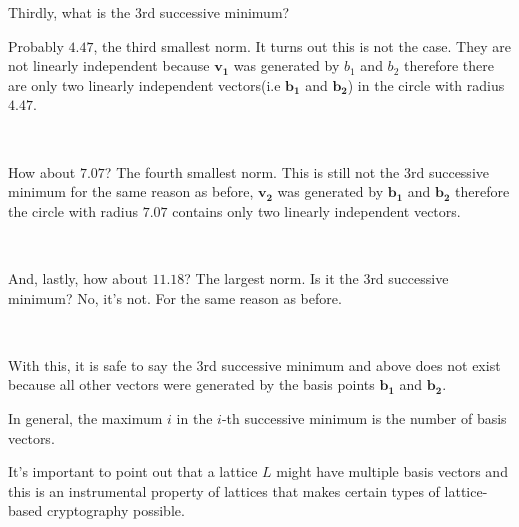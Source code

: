 \documentclass[11pt]{article}
\begin{document}
    Thirdly, what is the 3rd successive minimum?

Probably \(4.47\), the third smallest norm. It turns out this is not the
case. They are not linearly independent because \(\mathbf{v_1}\) was
generated by \(b_1\) and \(b_2\) therefore there are only two linearly
independent vectors(i.e \(\mathbf{b_1}\) and \(\mathbf{b_2}\)) in the
circle with radius \(4.47\).

    \begin{center}
    \end{center}
    { \hspace*{\fill} \\}
    
    How about \(7.07\)? The fourth smallest norm. This is still not the 3rd
successive minimum for the same reason as before, \(\mathbf{v_2}\) was
generated by \(\mathbf{b_1}\) and \(\mathbf{b_2}\) therefore the circle
with radius \(7.07\) contains only two linearly independent vectors.

    \begin{center}
    \end{center}
    { \hspace*{\fill} \\}
    
    And, lastly, how about \(11.18\)? The largest norm. Is it the 3rd
successive minimum? No, it's not. For the same reason as before.

    \begin{center}
    \end{center}
    { \hspace*{\fill} \\}
    
    With this, it is safe to say the 3rd successive minimum and above does
not exist because all other vectors were generated by the basis points
\(\mathbf{b_1}\) and \(\mathbf{b_2}\).

In general, the maximum \(i\) in the \(i\)-th successive minimum is the
number of basis vectors.

It's important to point out that a lattice \(L\) might have multiple
basis vectors and this is an instrumental property of lattices that
makes certain types of lattice-based cryptography possible.
\end{document}
